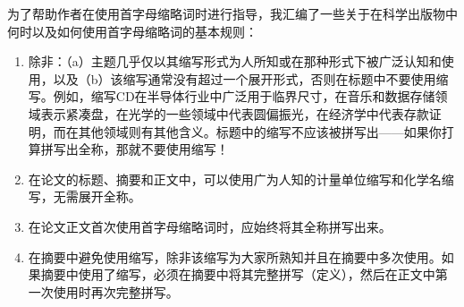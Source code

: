 为了帮助作者在使用首字母缩略词时进行指导，我汇编了一些关于在科学出版物中何时以及如何使用首字母缩略词的基本规则：

\begin{enumerate}
\item 除非：（a）主题几乎仅以其缩写形式为人所知或在那种形式下被广泛认知和使用，以及（b）该缩写通常没有超过一个展开形式，否则在标题中不要使用缩写。例如，缩写$\mathrm{CD}$在半导体行业中广泛用于临界尺寸，在音乐和数据存储领域表示紧凑盘，在光学的一些领域中代表圆偏振光，在经济学中代表存款证明，而在其他领域则有其他含义。标题中的缩写不应该被拼写出——如果你打算拼写出全称，那就不要使用缩写！

\item 在论文的标题、摘要和正文中，可以使用广为人知的计量单位缩写和化学名缩写，无需展开全称。

\item 在论文正文首次使用首字母缩略词时，应始终将其全称拼写出来。

\item 在摘要中避免使用缩写，除非该缩写为大家所熟知并且在摘要中多次使用。如果摘要中使用了缩写，必须在摘要中将其完整拼写（定义），然后在正文中第一次使用时再次完整拼写。


\end{enumerate}
